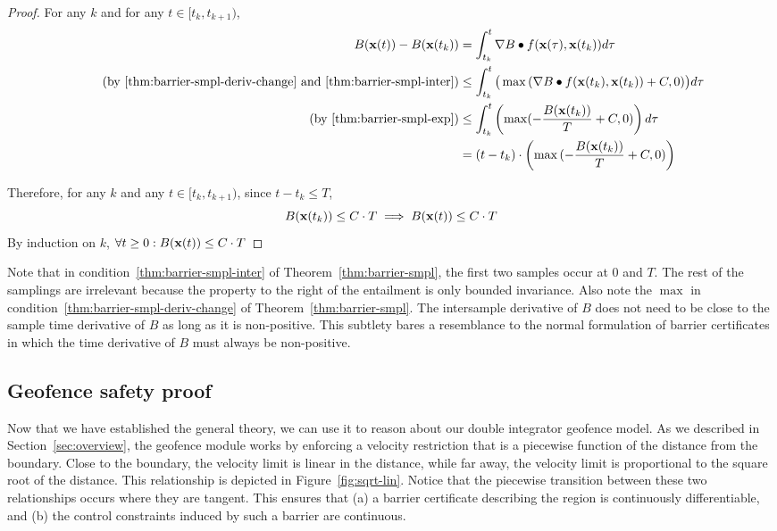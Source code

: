 \begin{proof}
For any $k$ and for any $t \in [t_k, t_{k+1})$,
\begin{align}
\nonumber
B(\vecbold{x}(t)) - B(\vecbold{x}(t_k)) &= \int_{t_k}^t \nabla B \dotprod f(\vecbold{x}(\tau),\vecbold{x}(t_k)) d\tau\\
\tag{by~\eqref{thm:barrier-smpl-deriv-change} and~\eqref{thm:barrier-smpl-inter}}
&\leq \int_{t_k}^t \big(\max{(\nabla B \dotprod f(\vecbold{x}(t_k),\vecbold{x}(t_k)) + C,0)}\big) d\tau \\
\tag{by~\eqref{thm:barrier-smpl-exp}}
&\leq \int_{t_k}^t \left(\max({-\frac{B(\vecbold{x}(t_k))}{T} + C,0)}\right) d\tau \\
\nonumber
&= (t - t_k) \cdot \left(\max{(-\frac{B(\vecbold{x}(t_k))}{T} + C,0)}\right)
\end{align}

Therefore, for any $k$ and any $t \in [t_k,t_{k+1})$, since $t - t_k \leq T$,
\begin{equation}
B(\mathbf{x}(t_k)) \leq C\cdot T \implies B(\mathbf{x}(t)) \leq C\cdot T
\end{equation}
By induction on $k$, $\forall t \geq 0 : B(\mathbf{x}(t)) \leq C\cdot T$
\end{proof}

Note that in condition~\eqref{thm:barrier-smpl-inter} of
Theorem~\ref{thm:barrier-smpl}, the first two samples occur at 0 and
$T$. The rest of the samplings are irrelevant because the property to the
right of the entailment is only bounded invariance. Also note the $\max{}$
in condition~\eqref{thm:barrier-smpl-deriv-change} of
Theorem~\ref{thm:barrier-smpl}. The intersample derivative of $B$ does not
need to be close to the sample time derivative of $B$ as long as it is
non-positive. This subtlety bares a resemblance to the normal formulation
of barrier certificates in which the time derivative of $B$ must always be
non-positive.

\subsection{Geofence safety proof}
\label{sec:proof-geofence}
Now that we have established the general theory, we can use it to reason
about our double integrator geofence model. As we described in
Section~\ref{sec:overview}, the geofence module works by enforcing a
velocity restriction that is a piecewise function of the distance from the
boundary. Close to the boundary, the velocity limit is linear in the
distance, while far away, the velocity limit is proportional to the square
root of the distance. This relationship is depicted in
Figure~\ref{fig:sqrt-lin}. Notice that the piecewise transition between
these two relationships occurs where they are tangent. This ensures that
(a) a barrier certificate describing the region is continuously
differentiable, and (b) the control constraints induced by such a barrier
are continuous.

